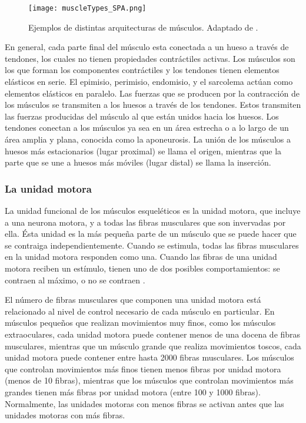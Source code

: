 \begin{figure}[!ht]
	\centering
		\texttt{[image: muscleTypes\_SPA.png]}
	\caption[Ejemplos de arquitectura de músculos.]{Ejemplos de distintas arquitecturas de músculos. Adaptado de \citep{oatis2009kynesiology}.}
	\label{fig:muscleArchitecture}
\end{figure}

En general, cada parte final del músculo esta conectada a un hueso a través de tendones, los cuales no tienen propiedades contráctiles activas. Los músculos son los que forman los componentes contráctiles y los tendones tienen elementos elásticos en serie. El epimisio, perimisio, endomisio, y el sarcolema actúan como elementos elásticos en paralelo. Las fuerzas que se producen por la contracción de los músculos se transmiten a los huesos a través de los tendones. Estos transmiten las fuerzas producidas del músculo al que están unidos hacia los huesos. Los tendones conectan a los músculos ya sea en un área estrecha o a lo largo de un área amplia y plana, conocida como la aponeurosis. La unión de los músculos a huesos más estacionarios (lugar proximal) se llama el origen, mientras que la parte que se une a huesos más móviles (lugar distal) se llama la inserción. 

\subsubsection{La unidad motora}

La unidad funcional de los músculos esqueléticos es la unidad motora, que incluye a una neurona motora, y a todas las fibras musculares que son invervadas por ella. Ésta unidad es la más pequeña parte de un músculo que se puede hacer que se contraiga independientemente. Cuando se estimula, todas las fibras musculares en la unidad motora responden como una. Cuando las fibras de una unidad motora reciben un estímulo, tienen uno de dos posibles comportamientos: se contraen al máximo, o no se contraen \citep{biomechanics2012nordin, criswell2011cram}.

El número de fibras musculares que componen una unidad motora está relacionado al nivel de control necesario de cada músculo en particular. En músculos pequeños que realizan movimientos muy finos, como los músculos extraoculares, cada unidad motora puede contener menos de una docena de fibras musculares, mientras que un músculo grande que realiza movimientos toscos, cada unidad motora puede contener entre hasta 2000 fibras musculares. Los músculos que controlan movimientos más finos tienen menos fibras por unidad motora (menos de 10 fibras), mientras que los músculos que controlan movimientos más grandes tienen más fibras por unidad motora (entre 100 y 1000 fibras). Normalmente, las unidades motoras con menos fibras se activan antes que las unidades motoras con más fibras.

